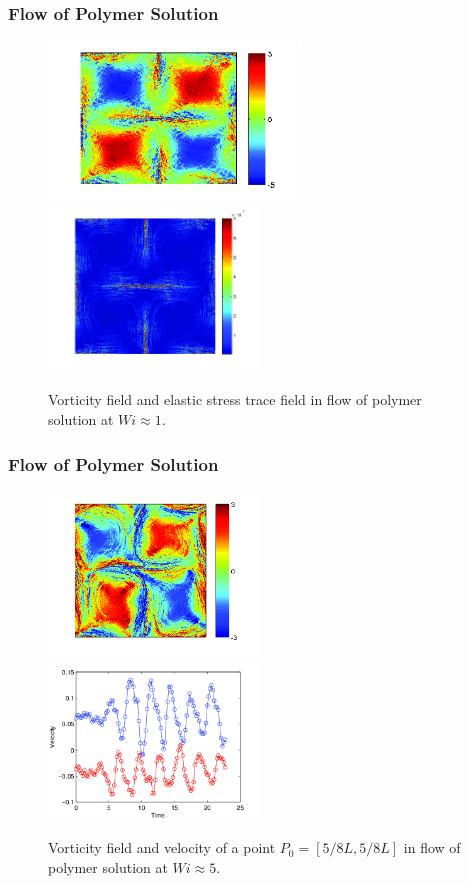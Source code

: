\begin{frame}
  \frametitle{Flow of Polymer Solution}
  \begin{figure}
    \centering
    \includegraphics[width=0.6\textwidth]{img/polymer_loc-10.png}
  \includegraphics[width=0.5\textwidth]{img/polymer_loc-6.png}
    \caption{Vorticity field and elastic stress trace field in flow of polymer solution at $Wi\approx1$.}
    \label{fig:vor_pol1}
  \end{figure}
\end{frame}

\begin{frame}
  \frametitle{Flow of Polymer Solution}
\begin{figure}[ht]
\includegraphics[width=0.5\textwidth]{img/polymer_loc-13.png}
\includegraphics[width=0.5\textwidth]{img/polymer_loc-7.png}
\caption{Vorticity field and velocity of a point $P_0=[5/8L,5/8L]$ in flow of polymer solution at $Wi\approx5$.}
\label{fug:vor_pol5}
\end{figure}
\end{frame}

